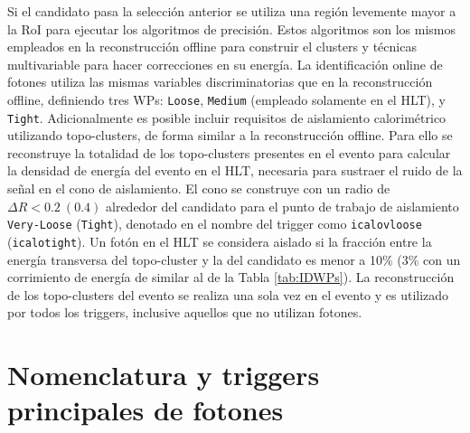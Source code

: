 Si el candidato pasa la selección anterior se utiliza una región levemente mayor a la RoI para ejecutar los algoritmos de precisión. Estos algoritmos son los mismos empleados en la reconstrucción offline \cite{Lampl:1099735} para construir el clusters y técnicas multivariable \cite{PERF-2017-03} para hacer correcciones en su energía. La identificación online de fotones utiliza las mismas variables discriminatorias que en la reconstrucción offline, definiendo tres WPs: \texttt{Loose}, \texttt{Medium} (empleado solamente en el HLT), y \texttt{Tight}.
Adicionalmente es posible incluir requisitos de aislamiento calorimétrico utilizando topo-clusters, de forma similar a la reconstrucción offline. Para ello se reconstruye la totalidad de los topo-clusters presentes en el evento para calcular la densidad de energía del evento en el HLT, necesaria para sustraer el ruido de la señal en el cono de aislamiento. El cono se construye con un radio de  $\Delta R < 0.2\:(0.4)$ alrededor del candidato para el punto de trabajo de aislamiento \texttt{Very-Loose} (\texttt{Tight}), denotado en el nombre del trigger como \texttt{icalovloose} (\texttt{icalotight}). Un fotón en el HLT se considera aislado si la fracción entre la energía transversa del topo-cluster y la del candidato es menor a
10\% (3\% con un corrimiento de energía de  similar al de la Tabla \ref{tab:IDWPs}). La reconstrucción de los topo-clusters del evento se realiza una sola vez en el evento y es utilizado por todos los triggers, inclusive aquellos que no utilizan fotones. 




\section{Nomenclatura y triggers principales de fotones}




